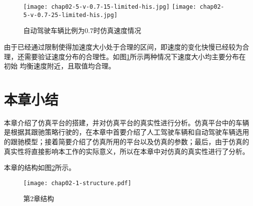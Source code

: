 \begin{figure}
  \centering
    {\texttt{[image: chap02-5-v-0.7-15-limited-his.jpg]}}
    {\texttt{[image: chap02-5-v-0.7-25-limited-his.jpg]}}
  \caption{自动驾驶车辆比例为$0.7$时仿真速度情况}
  \label{fig:chap02-7}
\end{figure}

由于已经通过限制使得加速度大小处于合理的区间，即速度的变化快慢已经较为合理，还需要验证速度分布的合理性。如图\ref{fig:chap02-7}所示两种情况下速度大小均主要分布在初始
均衡速度附近，且取值均合理。

\section{本章小结}

本章介绍了仿真平台的搭建，并对仿真平台的真实性进行分析。仿真平台中的车辆是根据其跟驰策略行驶的，在本章中首要介绍了人工驾驶车辆和自动驾驶车辆选用
的跟驰模型；接着简要介绍了仿真所用的平台以及仿真的参数；最后，由于仿真的真实性将直接影响本工作的实际意义，所以在本章中对仿真的真实性进行了分析。

本章的结构如图\ref{fig:chap02-1-logic}所示。

\begin{figure}
  \centering
  \texttt{[image: chap02-1-structure.pdf]}
  \caption{第2章结构}
  \label{fig:chap02-1-logic}
\end{figure}